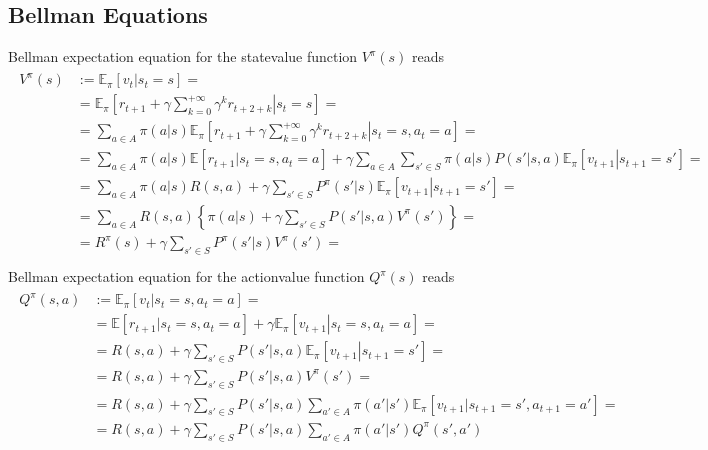 \documentclass[letterpaper,10pt,english]{jupyterBook}
\begin{document}
\subsection{Bellman Equations}
\label{\detokenize{ch/rl/mdp:bellman-equations}}\label{\detokenize{ch/rl/mdp:rl-mdp-dp-bellman-equations}}
\sphinxAtStartPar
{} Bellman expectation equation for the state\sphinxhyphen{}value function \(V^{\pi}(s)\) reads
\begin{equation}\label{equation:ch/rl/mdp:eq:bellman:v:exp}
\begin{split}\begin{aligned}
  V^{\pi}(s) 
  &:= \mathbb{E}_{\pi} \left[ v_t | s_t = s \right] = \\
  & = \mathbb{E}_{\pi} \left[ \left. r_{t+1} + \gamma \sum_{k=0}^{+\infty} \gamma^{k} r_{t+2+k} \right| s_t = s \right] = \\
  & = \sum_{a \in A} \pi(a|s) \mathbb{E}_{\pi} \left[ \left. r_{t+1} + \gamma \sum_{k=0}^{+\infty} \gamma^{k} r_{t+2+k} \right| s_t = s, a_t = a \right] = \\
  & = \sum_{a \in A} \pi(a|s) \mathbb{E} \left[ r_{t+1} | s_t = s, a_t = a \right] + \gamma \sum_{a \in A} \sum_{s' \in S} \pi(a|s) P(s'|s,a) \mathbb{E}_{\pi} \left[ \left. v_{t+1} \right| s_{t+1} = s' \right] = \\
  & = \sum_{a \in A} \pi(a|s) R(s,a) + \gamma \sum_{s' \in S} P^{\pi}(s'|s) \mathbb{E}_{\pi} \left[ \left. v_{t+1} \right| s_{t+1} = s' \right] = \\
  & = \sum_{a \in A} R(s,a) \left\{  \pi(a|s) + \gamma \sum_{s' \in S} P(s'|s,a) V^{\pi}(s') \right\} = \\
  & = R^{\pi}(s) + \gamma \sum_{s' \in S} P^{\pi}(s'|s) V^{\pi}(s') = \\
\end{aligned}\end{split}
\end{equation}
\sphinxAtStartPar
Bellman expectation equation for the action\sphinxhyphen{}value function \(Q^{\pi}(s)\) reads
\begin{equation}\label{equation:ch/rl/mdp:eq:bellman:q:exp}
\begin{split}\begin{aligned}
  Q^{\pi}(s,a)
  &:= \mathbb{E}_{\pi} \left[ v_t | s_t = s, a_t = a \right] = \\
  & = \mathbb{E} \left[ r_{t+1} | s_t = s, a_t = a \right] + \gamma \mathbb{E}_{\pi} \left[ \left. v_{t+1} \right| s_t = s, a_t = a \right] = \\
  & = R(s,a) + \gamma \sum_{s' \in S} P(s'|s,a) \mathbb{E}_{\pi} \left[ \left. v_{t+1} \right| s_{t+1} = s' \right] = \\
  & = R(s,a) + \gamma \sum_{s' \in S} P(s'|s,a) V^{\pi}(s') = \\
  & = R(s,a) + \gamma \sum_{s' \in S} P(s'|s,a) \sum_{a' \in A} \pi(a'|s') \mathbb{E}_{\pi}[ v_{t+1} | s_{t+1} = s', a_{t+1} = a' ] = \\
  & = R(s,a) + \gamma \sum_{s' \in S} P(s'|s,a) \sum_{a' \in A} \pi(a'|s') Q^{\pi}(s', a')
\end{aligned}\end{split}
\end{equation}
\end{document}
